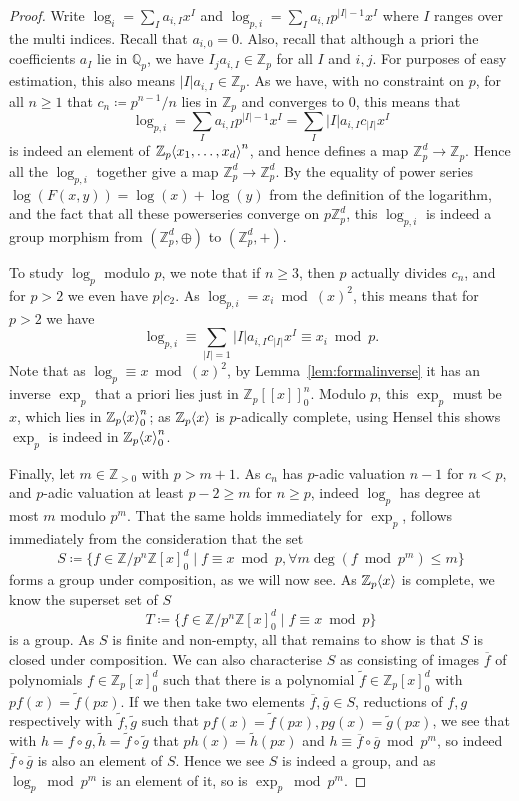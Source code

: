 \documentclass[12pt]{article}
\newcommand{\Z}{\mathbb{Z}}
\newcommand{\Q}{\mathbb{Q}}
\renewcommand{\angle}[1]{\hspace{-2pt}\left\langle #1 \right\rangle}
\theoremstyle{plain}
\theoremstyle{definition}
\theoremstyle{remark}
\begin{document}
\begin{proof}
Write $\log_{i} = \sum_{I} a_{i,I} x^I$ and $\log_{p,i} = \sum_I a_{i,I} p^{|I|-1} x^I$ where $I$ ranges over the multi indices. Recall that $a_{i,0} = 0$. Also, recall that although a priori the coefficients $a_I$ lie in $\Q_p$, we have $I_j a_{i,I} \in \Z_p$ for all $I$ and $i,j$. For purposes of easy estimation, this also means $|I|a_{i,I} \in \Z_p$. As we have, with no constraint on $p$, for all $n\geq 1$ that $c_n\coloneqq p^{n-1}/n$ lies in $\Z_p$ and converges to $0$, this means that \[ \log_{p,i} = \sum_I a_{i,I} p^{|I|-1} x^I = \sum_I |I|a_{i,I} c_{|I|} x^I\] is indeed an element of $\Z_p\angle{x_1,\dots,x_d}^n$, and hence defines a map $\Z_p^d \to \Z_p$. Hence all the $\log_{p,i}$ together give a map $\Z_p^d \to \Z_p^d$. By the equality of power series $\log(F(x,y)) = \log(x)+\log(y)$ from the definition of the logarithm, and the fact that all these powerseries converge on $p\Z_p^d$, this $\log_{p,i}$ is indeed a group morphism from $(\Z_p^d,\oplus)$ to $(\Z_p^d,+)$.

To study $\log_p$ modulo $p$, we note that if $n\geq 3$, then $p$ actually divides $c_n$, and for $p > 2$ we even have $p|c_2$. As $\log_{p,i} = x_i \bmod (x)^2$, this means that for $p > 2$ we have \[\log_{p,i} \equiv \sum_{|I| = 1} |I|a_{i,I}c_{|I|} x^I \equiv x_i \bmod p.\]
Note that as $\log_p \equiv x \bmod (x)^2$, by Lemma~\ref{lem:formalinverse} it has an inverse $\exp_p$ that a priori lies just in $\Z_p[[x]]_0^n$. Modulo $p$, this $\exp_p$ must be $x$, which lies in $\Z_p\angle{x}_0^n$; as $\Z_p\angle{x}$ is $p$-adically complete, using Hensel this shows $\exp_p$ is indeed in $\Z_p\angle{x}_0^n$.

Finally, let $m \in \Z_{>0}$ with $p > m+1$. As $c_n$ has $p$-adic valuation $n-1$ for $n < p$, and $p$-adic valuation at least $p-2 \geq m$ for $n \geq p$, indeed $\log_p$ has degree at most $m$ modulo $p^m$. That the same holds immediately for $\exp_p$, follows immediately from the consideration that the set
\[
S \coloneqq \{f \in \Z/p^n\Z[x]_0^d \mid  f \equiv x \bmod p, \forall m \deg(f \bmod p^m) \leq m\}
\]
forms a group under composition, as we will now see. As $\Z_p\angle{x}$ is complete, we know the superset set of $S$
\[
T \coloneqq \{f \in \Z/p^n\Z[x]_0^d \mid  f \equiv x \bmod p\}
\]
is a group. As $S$ is finite and non-empty, all that remains to show is that $S$ is closed under composition. We can also characterise $S$ as consisting of images $\overline{f}$ of polynomials $f \in \Z_p[x]_0^d$ such that there is a polynomial $\widetilde{f}\in\Z_p[x]_0^d$ with $pf(x) = \widetilde{f}(px)$. If we then take two elements $\overline{f},\overline{g} \in S$, reductions of $f,g$ respectively with $\widetilde{f},\widetilde{g}$ such that $pf(x) = \widetilde{f}(px), pg(x) = \widetilde{g}(px)$, we see that with $h = f\circ g, \widetilde{h} = \widetilde{f} \circ \widetilde{g}$ that $ph(x) = \widetilde{h}(px)$ and $h \equiv \overline{f} \circ \overline{g} \bmod p^m$, so indeed $\overline{f} \circ \overline{g}$ is also an element of $S$. Hence we see $S$ is indeed a group, and as $\log_p \bmod p^m$ is an element of it, so is $\exp_p \bmod p^m$.
\end{proof}
\end{document}
